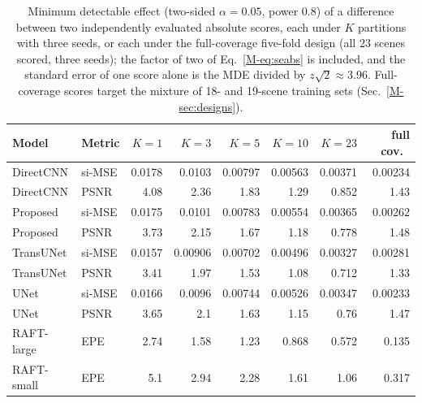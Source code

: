 \begin{table}[!htb]\centering\caption{Minimum detectable effect (two-sided $\alpha=0.05$, power $0.8$) of a difference between two independently evaluated absolute scores, each under $K$ partitions with three seeds, or each under the full-coverage five-fold design (all 23 scenes scored, three seeds); the factor of two of Eq.~\eqref{M-eq:seabs} is included, and the standard error of one score alone is the MDE divided by $z\sqrt2\approx3.96$. Full-coverage scores target the mixture of 18- and 19-scene training sets (Sec.~\ref{M-sec:designs}).}\label{tab:resolution_abs}
\footnotesize\begin{tabular}{llrrrrrr}\toprule
Model & Metric & $K{=}1$ & $K{=}3$ & $K{=}5$ & $K{=}10$ & $K{=}23$ & full cov.\ \\\midrule
DirectCNN & si-MSE & 0.0178 & 0.0103 & 0.00797 & 0.00563 & 0.00371 & 0.00234 \\
DirectCNN & PSNR & 4.08 & 2.36 & 1.83 & 1.29 & 0.852 & 1.43 \\
Proposed & si-MSE & 0.0175 & 0.0101 & 0.00783 & 0.00554 & 0.00365 & 0.00262 \\
Proposed & PSNR & 3.73 & 2.15 & 1.67 & 1.18 & 0.778 & 1.48 \\
TransUNet & si-MSE & 0.0157 & 0.00906 & 0.00702 & 0.00496 & 0.00327 & 0.00281 \\
TransUNet & PSNR & 3.41 & 1.97 & 1.53 & 1.08 & 0.712 & 1.33 \\
UNet & si-MSE & 0.0166 & 0.0096 & 0.00744 & 0.00526 & 0.00347 & 0.00233 \\
UNet & PSNR & 3.65 & 2.1 & 1.63 & 1.15 & 0.76 & 1.47 \\
RAFT-large & EPE & 2.74 & 1.58 & 1.23 & 0.868 & 0.572 & 0.135 \\
RAFT-small & EPE & 5.1 & 2.94 & 2.28 & 1.61 & 1.06 & 0.317 \\
\bottomrule\end{tabular}\end{table}
